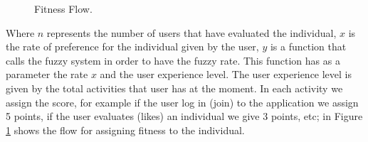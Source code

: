 \begin{figure}
\captionsetup{justification=centering,margin=2cm}
\centering
\setlength\fboxsep{0pt}
\setlength\fboxrule{0.7pt}
\caption{Fitness Flow.}
\label{fig:fitnessFlow}
\end{figure}



Where $n$ represents  the number of  users that have evaluated the
individual, $x$ is the rate of preference for the  individual  given by the user,
$y$ is a function that calls the fuzzy system in order to have the fuzzy rate.
This function has as a parameter the rate $x$ and the user experience level.
The user experience level
is given  by the  total activities that user has at the moment. In each
activity we assign the score, for example if the user log in (join) to the
application we assign 5 points, if the user evaluates (likes) an individual we
give 3 points, etc; in Figure \ref{fig:fitnessFlow} shows the flow for assigning fitness to
the individual.
